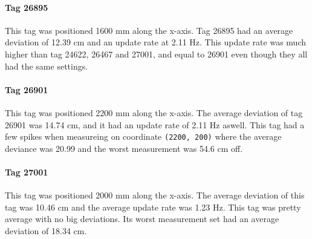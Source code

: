 \paragraph{Tag 26895}
This tag was positioned 1600 mm along the x-axis.
Tag 26895 had an average deviation of 12.39 cm and an update rate at 2.11 Hz. 
This update rate was much higher than tag 24622, 26467 and 27001, and equal to 26901 even though they all had the same settings.

\paragraph{Tag 26901}
This tag was positioned 2200 mm along the x-axis.
The average deviation of tag 26901 was 14.74 cm, and it had an update rate of 2.11 Hz aswell.
This tag had a few spikes when measureing on coordinate \texttt{(2200, 200)} where the average deviance was 20.99 and the worst measurement was 54.6 cm off.

\paragraph{Tag 27001}
This tag was positioned 2000 mm along the x-axis.
The average deviation of this tag was 10.46 cm and the average update rate was 1.23 Hz.
This tag was pretty average with no big deviations.
Its worst measurement set had an average deviation of 18.34 cm.


